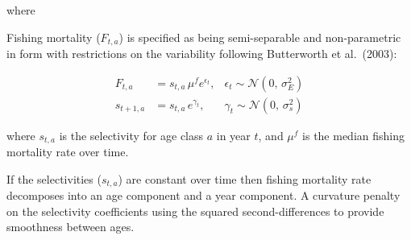 \documentclass[11pt,
  english,
  a4paper,
]{article}
\begin{document}
\leavevmode\tagmcend\tagstructend\par

where


Fishing mortality ({\(F_{t,a}\)\leavevmode\tagmcend\tagstructend}) is specified as being semi-separable and non-parametric in form with restrictions on the variability following Butterworth et al.~(2003):

\leavevmode\tagmcend\tagstructend\par


\begin{align}
    F_{t,a}     &= s_{t,a} \, \mu^f e^{\epsilon_t}, &\epsilon_t   \sim \mathcal{N}(0,\,\sigma_E^{2}) \\
    s_{t+1,a}   &= s_{t,a} \,       e^{\gamma_t},   &\gamma_t     \sim \mathcal{N}(0,\,\sigma_s^{2}) 
\end{align}

\leavevmode\tagmcend\tagstructend\par


where {\(s_{t,a}\)\leavevmode\tagmcend\tagstructend} is the selectivity for age class {\(a\)\leavevmode\tagmcend\tagstructend} in year {\(t\)\leavevmode\tagmcend\tagstructend}, and {\(\mu^f\)\leavevmode\tagmcend\tagstructend} is the median fishing mortality rate over time.

\leavevmode\tagmcend\tagstructend\par


If the selectivities ({\(s_{t,a}\)\leavevmode\tagmcend\tagstructend}) are constant over time then fishing mortality rate decomposes into an age component and a year component. A curvature penalty on the selectivity coefficients using the squared second-differences to provide smoothness between ages.

\leavevmode\tagmcend\tagstructend\par

\end{document}
